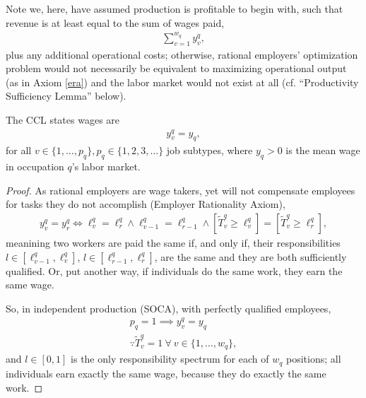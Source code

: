 \documentclass[hidelinks, nonatbib]{elsarticle}
\begin{document}
Note we, here, have assumed production is profitable to begin with, such that revenue is at least equal to the sum of wages paid,
    \begin{gather}
        \sum_{v=1}^{w_q}
        y_{v}^{q}
        ,
    \end{gather}
plus any additional operational costs; otherwise, rational employers' optimization problem would not necessarily be equivalent to maximizing operational output (as in Axiom \ref{era}) and the labor market would not exist at all (cf. ``Productivity Sufficiency Lemma'' below).

\begin{lemma}
    \label{ccl}
    The CCL states wages are
    \begin{gather}
        y_{v}^{q}
        =
        y_q
        ,
    \end{gather}
    for all $v \in \{1, \dots, p_q\}, p_q \in \{1, 2, 3, \dots\}$ job subtypes, where $y_q > 0 $ is the mean wage in occupation $q$'s labor market.

    \begin{proof}
        As rational employers are wage takers, yet will not compensate employees for tasks they do not accomplish (Employer Rationality Axiom),
        \begin{gather}
            y_{v}^{q}
            =
            y_{r}^{q}
            \iff
            \ell_{v}^{q}
            =
            \ell_{r}^{q}
            \land
            \ell_{v-1}^{q}
            =
            \ell_{r-1}^{q}
            \land
            [
                \tilde{T}_{v}^{q}
                \geq
                \ell_{v}^{q}
            ]
            =
            [
                \tilde{T}_{v}^{q}
                \geq
                \ell_{r}^{q}
            ]
            ,
        \end{gather}
        meanining two workers are paid the same if, and only if, their responsibilities $l \in [\ell_{v-1}^{q}, \ell_{v}^{q}]$, $l \in [\ell_{r-1}^{q}, \ell_{r}^{q}]$, are the same and they are both sufficiently qualified. Or, put another way, if individuals do the same work, they earn the same wage.

        So, in independent production (SOCA), with perfectly qualified employees,
        \begin{gather}
            p_q = 1
            \implies
            y_{v}^{q}
            =
            y_q
            \\
            \because
            \tilde{T}_{v}^{q} = 1
            \
            \forall
            \
            v \in \{1, \dots, w_q\}
            ,
        \end{gather}
        and $l \in [0,1]$ is the only responsibility spectrum for each of $w_q$ positions; all individuals earn exactly the same wage, because they do exactly the same work.
        

\end{proof}
\end{lemma}
\end{document}

